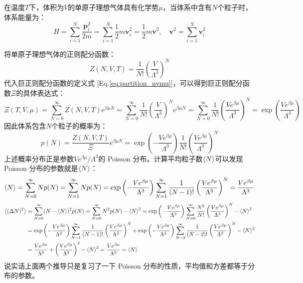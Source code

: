 \begin{proposition}[巨正则系综下的单原子理想气体]
在温度$T$下，体积为$V$的单原子理想气体具有化学势$\mu$，当体系中含有$N$个粒子时，体系能量为：
\[H=\sum_{i=1}^{N}\frac{\bm{p}_i^2}{2m}=\sum_{i=1}^{N}\frac{1}{2}m\bm{v}_i^2=\frac{1}{2}m\bm{v}^2, \quad \bm{v}^2=\sum_{i=1}^{N}\bm{v}_i^2\]
\end{proposition}
将单原子理想气体的正则配分函数：
\[Z(N,V,T)=\frac{1}{N!}\left(\frac{V}{\Lambda^3}\right)^N\]
代入巨正则配分函数的定义式 [Eq.\eqref{eq:partition_nvmu}]，可以得到巨正则配分函数$\Xi$的具体表达式：
\[\Xi(T,V,\mu)=\sum_{N=0}^{\infty}Z(N,V,T)e^{\beta\mu N}=\sum_{N=0}^{\infty}\frac{1}{N!}\left(\frac{V}{\Lambda^3}\right)^N e^{\beta\mu N}=\sum_{N=0}^{\infty}\frac{1}{N!}\left(\frac{Ve^{\beta\mu}}{\Lambda^3}\right)^N=\exp\left(\frac{Ve^{\beta\mu}}{\Lambda^3}\right)\]
因此体系包含$N$个粒子的概率为：
\[p(N)=\frac{Z(N,V,T)}{\Xi}e^{\beta\mu N}=\exp\left(-\frac{Ve^{\beta\mu}}{\Lambda^3}\right)\frac{1}{N!}\left(\frac{Ve^{\beta\mu}}{\Lambda^3}\right)^N\]
上述概率分布正是参数$Ve^{\beta\mu}/\Lambda^3$的 Poisson 分布。计算平均粒子数$\expval{N}$可以发现 Poisson 分布的参数就是$\expval{N}$：
\[\expval{N}=\sum_{N=0}^{\infty}Np(N)=\sum_{N=1}^{\infty}Np(N)=\exp\left(-\frac{Ve^{\beta\mu}}{\Lambda^3}\right)\sum_{N=1}^{\infty}\frac{1}{(N-1)!}\left(\frac{Ve^{\beta\mu}}{\Lambda^3}\right)^N=\frac{Ve^{\beta\mu}}{\Lambda^3}\]
\[\begin{aligned}
\expval{(\Delta N)^2}&=\sum_{N=0}^{\infty}(N-\expval{N})^2p(N)=\sum_{N=0}^{\infty}N^2p(N)-\expval{N}^2=\exp\left(-\frac{Ve^{\beta\mu}}{\Lambda^3}\right)\sum_{N=0}^{\infty}\frac{N^2}{N!}\left(\frac{Ve^{\beta\mu}}{\Lambda^3}\right)^N-\expval{N}^2\\
&=\exp\left(-\frac{Ve^{\beta\mu}}{\Lambda^3}\right)\sum_{N=1}^{\infty}\frac{1}{(N-1)!}\left(\frac{Ve^{\beta\mu}}{\Lambda^3}\right)^N+\exp\left(-\frac{Ve^{\beta\mu}}{\Lambda^3}\right)\sum_{N=2}^{\infty}\frac{1}{(N-2)!}\left(\frac{Ve^{\beta\mu}}{\Lambda^3}\right)^N-\expval{N}^2\\
&=\frac{Ve^{\beta\mu}}{\Lambda^3}+\left(\frac{Ve^{\beta\mu}}{\Lambda^3}\right)^2-\expval{N}^2=\frac{Ve^{\beta\mu}}{\Lambda^3}=\expval{N}
\end{aligned}\]
说实话上面两个推导只是复习了一下 Poisson 分布的性质，平均值和方差都等于分布的参数。

